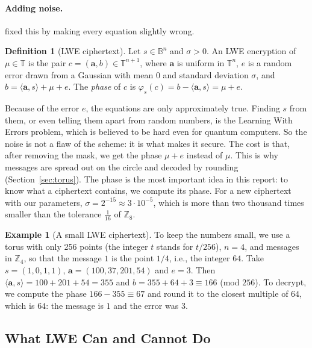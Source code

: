 \documentclass[12pt]{article}
\theoremstyle{plain}
\theoremstyle{definition}
\newtheorem{definition}{Definition}
\newtheorem{example}{Example}
\newcommand{\T}{\mathbb{T}}
\newcommand{\Z}{\mathbb{Z}}
\newcommand{\B}{\mathbb{B}}
\begin{document}
\paragraph{Adding noise.}
\cite{regev2005lwe} fixed this by making every equation slightly wrong.

\begin{definition}[LWE ciphertext]
Let $s\in\B^n$ and $\sigma>0$. An LWE encryption of $\mu\in\T$ is the pair
$c=(\mathbf{a},b)\in\T^{n+1}$, where $\mathbf{a}$ is uniform in $\T^n$, $e$ is a
random error drawn from a Gaussian with mean $0$ and standard deviation
$\sigma$, and $b=\langle\mathbf{a},s\rangle+\mu+e$. The \emph{phase} of $c$ is
$\varphi_s(c)=b-\langle\mathbf{a},s\rangle=\mu+e$.
\end{definition}

Because of the error $e$, the equations are only approximately true. Finding
$s$ from them, or even telling them apart from random numbers, is the Learning
With Errors problem, which is believed to be hard even for quantum computers.
So the noise is not a flaw of the scheme: it is what makes it secure. The cost
is that, after removing the mask, we get the phase $\mu+e$ instead of $\mu$.
This is why messages are spread out on the circle and decoded by rounding
(Section~\ref{sec:torus}). The phase is the most important idea in this report:
to know what a ciphertext contains, we compute its phase. For a new ciphertext
with our parameters, $\sigma=2^{-15}\approx3\cdot10^{-5}$, which is more than two
thousand times smaller than the tolerance $\frac1{16}$ of $\Z_8$.

\begin{example}[A small LWE ciphertext]
To keep the numbers small, we use a torus with only 256 points (the integer
$t$ stands for $t/256$), $n=4$, and messages in $\Z_4$, so that the message $1$
is the point $1/4$, i.e., the integer $64$. Take $s=(1,0,1,1)$,
$\mathbf{a}=(100,37,201,54)$ and $e=3$. Then
$\langle\mathbf{a},s\rangle=100+201+54=355$ and $b=355+64+3\equiv166$
(mod $256$). To decrypt, we compute the phase $166-355\equiv67$ and round it to
the closest multiple of $64$, which is $64$: the message is $1$ and the error
was $3$.
\end{example}

\subsection{What LWE Can and Cannot Do}
\label{sec:limits}
\end{document}
